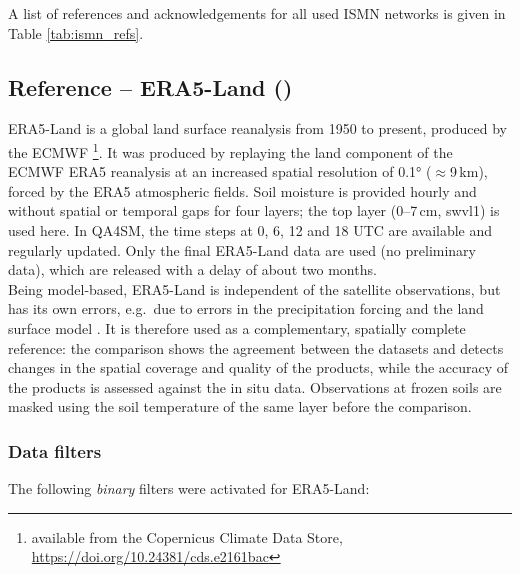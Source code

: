 \noindent A list of references and acknowledgements for all used \ac{ISMN} networks is given in Table \ref{tab:ismn_refs}.


\subsection{Reference -- ERA5-Land ()} \label{ssec:era5land}

\noindent ERA5-Land is a global land surface reanalysis from 1950 to present, produced by the \ac{ECMWF} \citep{munozsabater2021}\footnote{available from the Copernicus Climate Data Store, \url{https://doi.org/10.24381/cds.e2161bac}}.
It was produced by replaying the land component of the \ac{ECMWF} ERA5 reanalysis \citep{hersbach2020} at an increased spatial resolution of 0.1° ($\approx$9\,km), forced by the ERA5 atmospheric fields.
Soil moisture is provided hourly and without spatial or temporal gaps for four layers; the top layer (0--7\,cm, swvl1) is used here.
In \ac{QA4SM}, the time steps at 0, 6, 12 and 18 UTC are available and regularly updated.
Only the final ERA5-Land data are used (no preliminary data), which are released with a delay of about two months.
\\[1em]
\noindent Being model-based, ERA5-Land is independent of the satellite observations, but has its own errors, e.g.\ due to errors in the precipitation forcing and the land surface model \citep{munozsabater2021}.
It is therefore used as a complementary, spatially complete reference: the comparison shows the agreement between the datasets and detects changes in the spatial coverage and quality of the products, while the accuracy of the products is assessed against the in situ data.
Observations at frozen soils are masked using the soil temperature of the same layer before the comparison.

\subsubsection{Data filters}

\noindent The following \textit{binary} filters were activated for ERA5-Land:
\begin{itemize}
\end{itemize}
